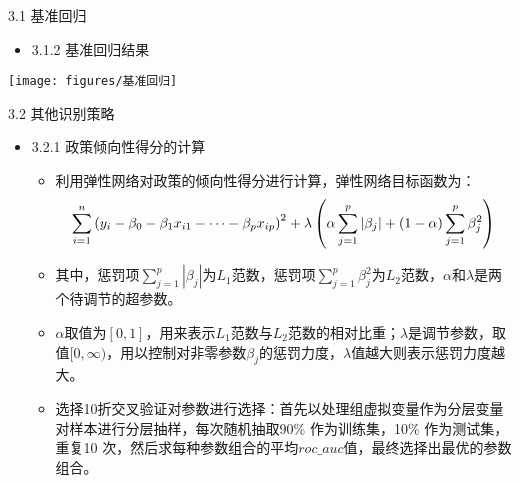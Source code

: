 \documentclass{beamer}%
\begin{document}
\begin{frame}[t]{\large 3.1 基准回归}
\begin{itemize}
  \item 3.1.2 基准回归结果
\end{itemize}
\vspace{-0.5cm} %
\begin{center}
	\texttt{[image: figures/基准回归]}
\end{center}
\end{frame}

\begin{frame}[t]{\large 3.2 其他识别策略}
\begin{itemize}
  \item 3.2.1 政策倾向性得分的计算
  \begin{itemize}
  \item  利用弹性网络对政策的倾向性得分进行计算，弹性网络目标函数为：
  \begin{equation}
  \setlength{\abovedisplayskip}{1pt}
  \setlength{\belowdisplayskip}{1pt}
    \sum_{i=1}^n\left(y_i-\beta_0-\beta_1 x_{i 1}-\cdots-\beta_p x_{i p}\right)^2+\lambda\left(\alpha \sum_{j=1}^p\left|\beta_j\right|+(1-\alpha) \sum_{j=1}^p \beta_j^2\right)
  \end{equation}
  \item  其中，惩罚项$\sum_{j=1}^p\left|\beta_j\right|$为$L_1$范数，惩罚项$\sum_{j=1}^p \beta_j^2$为$L_2$范数，$\alpha$和$\lambda$是两个待调节的超参数。
  \item $\alpha$取值为$[0,1]$，用来表示$L_1$范数与$L_2$范数的相对比重；$\lambda$是调节参数，取值$[0,\infty)$，用以控制对非零参数$\beta_j$的惩罚力度，$\lambda$值越大则表示惩罚力度越大。
  \item 选择10折交叉验证对参数进行选择：首先以处理组虚拟变量作为分层变量对样本进行分层抽样，每次随机抽取90\% 作为训练集，10\% 作为测试集，重复10 次，然后求每种参数组合的平均$roc\_auc$值，最终选择出最优的参数组合。
  \end{itemize}
\end{itemize}
\end{frame}
\end{document}
